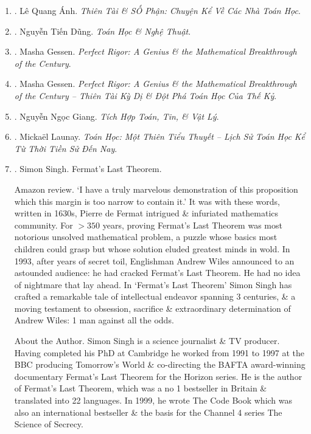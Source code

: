 \documentclass{article}
\begin{document}
\begin{enumerate}
	\item \cite{Anh_genius}. {\sc Lê Quang Ánh}. {\it Thiên Tài \& SỐ Phận: Chuyện Kể Về Các Nhà Toán Học}.\hfill{\sf[done]}
	
	\item \cite{Dung_math_art}. {\sc Nguyễn Tiến Dũng}. {\it Toán Học \& Nghệ Thuật}.\hfill{\sf[done]}
		
	\item \cite{Gessen2009}. {\sc Masha Gessen}. {\it Perfect Rigor: A Genius \& the Mathematical Breakthrough of the Century}.\hfill{\sf[done]}
	
	\item \cite{Gessen2022}. {\sc Masha Gessen}. {\it Perfect Rigor: A Genius \& the Mathematical Breakthrough of the Century -- Thiên Tài Kỳ Dị \& Đột Phá Toán Học Của Thế Kỷ}.\hfill{\sf[reading]}
	
	\item \cite{Giang_tich_hop_Toan_Tin_Ly}. {\sc Nguyễn Ngọc Giang}. {\it Tích Hợp Toán, Tin, \& Vật Lý}.\hfill{\sf[reading]}
	
	\item \cite{Launay2022}. {\sc Micka\"el Launay}. {\it Toán Học: Một Thiên Tiểu Thuyết -- Lịch Sử Toán Học Kể Từ Thời Tiền Sử Đến Nay}.\hfill{\sf[done]}
	
	\item \cite{Singh_last_Fermat_thm}. {\sc Simon Singh}. {Fermat's Last Theorem}. {}
	
	{\sf Amazon review.} `I have a truly marvelous demonstration of this proposition which this margin is too narrow to contain it.' It was with these words, written in 1630s, {\sc Pierre de Fermat} intrigued \& infuriated mathematics community. For $> 350$ years, proving Fermat's Last Theorem was most notorious unsolved mathematical problem, a puzzle whose basics most children could grasp but whose solution eluded greatest minds in wold. In 1993, after years of secret toil, Englishman {\sc Andrew Wiles} announced to an astounded audience: he had cracked Fermat's Last Theorem. He had no idea of nightmare that lay ahead. In `Fermat's Last Theorem' {\sc Simon Singh} has crafted a remarkable tale of intellectual endeavor spanning 3 centuries, \& a moving testament to obsession, sacrifice \& extraordinary determination of {\sc Andrew Wiles}: 1 man against all the odds.
	
	{\sf About the Author.} {\sc Simon Singh} is a science journalist \& TV producer. Having completed his PhD at Cambridge he worked from 1991 to 1997 at the BBC producing Tomorrow's World \& co-directing the BAFTA award-winning documentary Fermat's Last Theorem for the Horizon series. He is the author of Fermat's Last Theorem, which was a no 1 bestseller in Britain \& translated into 22 languages. In 1999, he wrote The Code Book which was also an international bestseller \& the basis for the Channel 4 series The Science of Secrecy.	
	

\end{enumerate}
\end{document}
